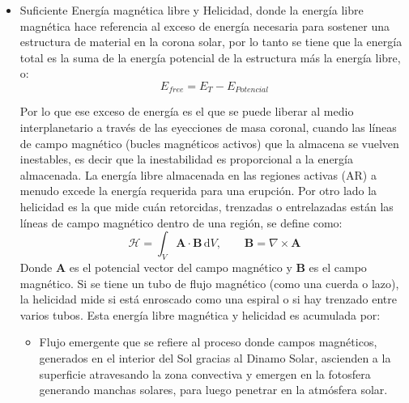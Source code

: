\begin{itemize}
    \item Suficiente Energía magnética libre y Helicidad, donde la energía libre magnética hace referencia al exceso de energía necesaria para sostener una estructura de material en la corona solar, por lo tanto se tiene que la energía total es la suma de la energía potencial de la estructura más la energía libre, o:
\begin{equation}
    E_{free}=E_{T}-E_{Potencial}
\end{equation}

Por lo que ese exceso de energía es el que se puede liberar al medio interplanetario a través de las eyecciones de masa coronal, cuando las líneas de campo magnético (bucles magnéticos activos) que la almacena se vuelven inestables, es decir que la inestabilidad es proporcional a la energía almacenada. La energía libre almacenada en las regiones activas (AR) a menudo excede la energía requerida para una erupción. 
Por otro lado la helicidad es la que mide cuán retorcidas, trenzadas o entrelazadas están las líneas de campo magnético dentro de una región, se define como:
\begin{equation}
    \mathcal{H} = \int_V \mathbf{A}\cdot \mathbf{B}\,\mathrm{d}V,
\qquad
\mathbf{B} = \nabla \times \mathbf{A}
\end{equation}
Donde $\mathbf{A}$ es el potencial vector del campo magnético y $\mathbf{B}$ es el campo magnético. Si se tiene un tubo de flujo magnético (como una cuerda o lazo), la helicidad mide si está enroscado como una espiral o si hay trenzado entre varios tubos.
Esta energía libre magnética y helicidad es acumulada por: 
    \begin{itemize}
    \item Flujo emergente que se refiere al proceso donde campos magnéticos, generados en el interior del Sol gracias al Dinamo Solar, ascienden a la superficie atravesando la zona convectiva y emergen en la fotosfera generando manchas solares, para luego penetrar en la atmósfera solar.
    

\end{itemize}
\end{itemize}
